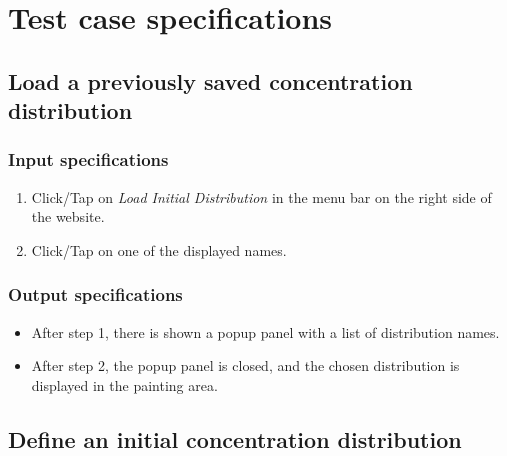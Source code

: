 \chapter{Test case specifications}

\section{Load a previously saved concentration distribution}

\subsection*{Input specifications}
\begin{enumerate}
\item Click/Tap on \emph{Load Initial Distribution} in the menu bar on the right side of the website.
\item Click/Tap on one of the displayed names.
\end{enumerate}

\subsection*{Output specifications}
\begin{itemize}
\item After step 1, there is shown a popup panel with a list of distribution names.
\item After step 2, the popup panel is closed, and the chosen distribution is displayed in the painting area.
\end{itemize}

\section{Define an initial concentration distribution}

